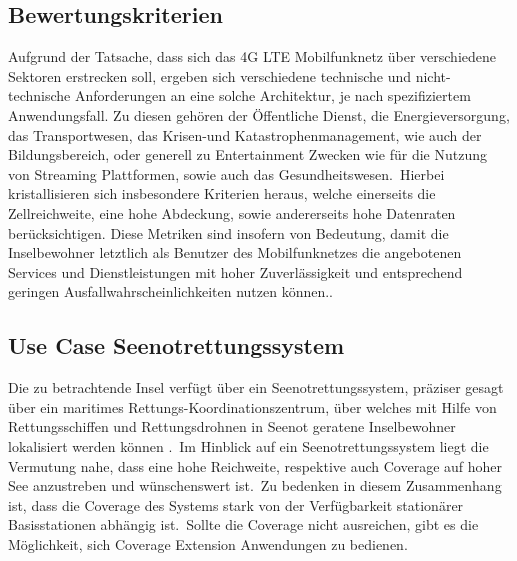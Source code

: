 \subsection{Bewertungskriterien}
\label{subsec: Bewertungskriterien}
Aufgrund der Tatsache, dass sich das 4G LTE Mobilfunknetz über verschiedene Sektoren erstrecken soll, ergeben sich verschiedene technische und nicht-technische Anforderungen an eine solche Architektur, je nach spezifiziertem Anwendungsfall. Zu diesen gehören der Öffentliche Dienst, die Energieversorgung, das Transportwesen, das Krisen-und Katastrophenmanagement, wie auch der Bildungsbereich, oder generell zu Entertainment Zwecken wie für die Nutzung von Streaming Plattformen, sowie auch das Gesundheitswesen.\ Hierbei kristallisieren sich insbesondere Kriterien heraus, welche einerseits die Zellreichweite, eine hohe Abdeckung, sowie andererseits hohe Datenraten berücksichtigen. Diese Metriken sind insofern von Bedeutung, damit die Inselbewohner letztlich als Benutzer des Mobilfunknetzes die angebotenen Services und Dienstleistungen mit hoher Zuverlässigkeit und entsprechend geringen Ausfallwahrscheinlichkeiten nutzen können.\cite{Tch18}. 

	\subsection{Use Case Seenotrettungssystem}
\label{subsec:Use Cases}



Die zu betrachtende Insel verfügt über ein Seenotrettungssystem, präziser gesagt über ein maritimes Rettungs-Koordinationszentrum, über welches mit Hilfe von Rettungsschiffen und Rettungsdrohnen in Seenot geratene Inselbewohner lokalisiert werden können%
.\ Im Hinblick auf ein Seenotrettungssystem liegt die Vermutung nahe, dass eine hohe Reichweite, respektive auch Coverage auf hoher See anzustreben und wünschenswert ist.\ Zu bedenken in diesem Zusammenhang ist, dass die Coverage des Systems stark von der Verfügbarkeit stationärer Basisstationen abhängig ist.\ Sollte die Coverage nicht ausreichen, gibt es die Möglichkeit, sich Coverage Extension Anwendungen zu bedienen.\ 

